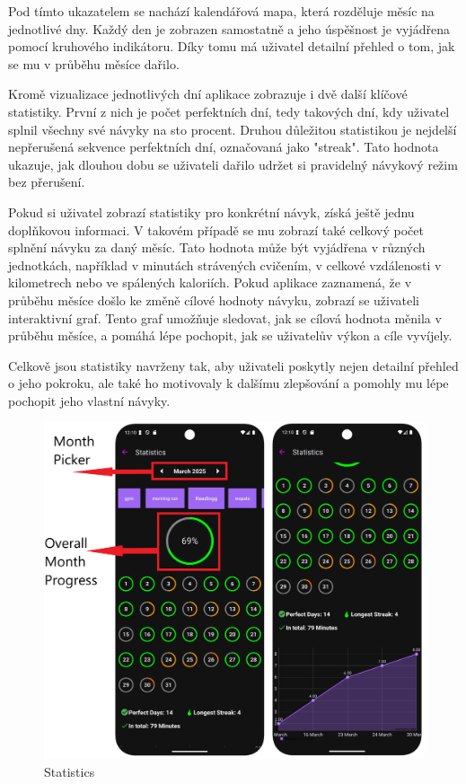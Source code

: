 Pod tímto ukazatelem se nachází kalendářová mapa, která rozděluje měsíc na jednotlivé dny. Každý den je zobrazen samostatně a jeho úspěšnost je vyjádřena pomocí kruhového indikátoru. Díky tomu má uživatel detailní přehled o tom, jak se mu v průběhu měsíce dařilo.  

Kromě vizualizace jednotlivých dní aplikace zobrazuje i dvě další klíčové statistiky. První z nich je počet perfektních dní, tedy takových dní, kdy uživatel splnil všechny své návyky na sto procent. Druhou důležitou statistikou je nejdelší nepřerušená sekvence perfektních dní, označovaná jako "streak". Tato hodnota ukazuje, jak dlouhou dobu se uživateli dařilo udržet si pravidelný návykový režim bez přerušení.  

Pokud si uživatel zobrazí statistiky pro konkrétní návyk, získá ještě jednu doplňkovou informaci. V takovém případě se mu zobrazí také celkový počet splnění návyku za daný měsíc. Tato hodnota může být vyjádřena v různých jednotkách, například v minutách strávených cvičením, v celkové vzdálenosti v kilometrech nebo ve spálených kaloriích.  
\newpage
Pokud aplikace zaznamená, že v průběhu měsíce došlo ke změně cílové hodnoty návyku, zobrazí se uživateli interaktivní graf. Tento graf umožňuje sledovat, jak se cílová hodnota měnila v průběhu měsíce, a pomáhá lépe pochopit, jak se uživatelův výkon a cíle vyvíjely.  

Celkově jsou statistiky navrženy tak, aby uživateli poskytly nejen detailní přehled o jeho pokroku, ale také ho motivovaly k dalšímu zlepšování a pomohly mu lépe pochopit jeho vlastní návyky.
\begin{figure}[H]
    \centering
    \includegraphics[width=1\linewidth]{images/supercuper.png}
    \caption{Statistics}
    \label{fig:Statistics}
\end{figure}

